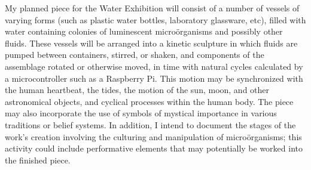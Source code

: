 \documentclass[a4paper,12pt]{article}
\begin{document}
My planned piece for the Water Exhibition will consist of a number of vessels of varying forms (such as plastic water bottles, laboratory glassware, etc), filled with water containing colonies of luminescent micro{\"o}rganisms and possibly other fluids. These vessels will be arranged into a kinetic sculpture in which fluids are pumped between containers, stirred, or shaken, and components of the assemblage rotated or otherwise moved, in time with natural cycles calculated by a microcontroller such as a Raspberry Pi. This motion may be synchronized with the human heartbeat, the tides, the motion of the sun, moon, and other astronomical objects, and cyclical processes within the human body. The piece may also incorporate the use of symbols of mystical importance in various traditions or belief systems. In addition, I intend to document the stages of the work's creation involving the culturing and manipulation of micro{\"o}rganisms; this activity could include performative elements that may potentially be worked into the finished piece.

\pagebreak
\begingroup
\singlespacing
\setlength{\emergencystretch}{1.5em} %
\printbibliography
\endgroup
\end{document}
